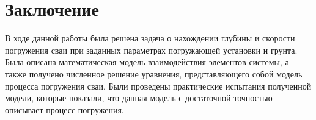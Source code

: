 \clearpage

\section*{Заключение}

В ходе данной работы была решена задача о нахождении глубины и скорости погружения сваи при заданных параметрах погружающей
установки и грунта. Была описана математическая модель взаимодействия элементов системы, а также получено численное решение
уравнения, представляющего собой модель процесса погружения сваи. Были проведены практические испытания полученной модели,
которые показали, что данная модель с достаточной точностью описывает процесс погружения.

\clearpage


\nocite{*}

\printbibliography{}